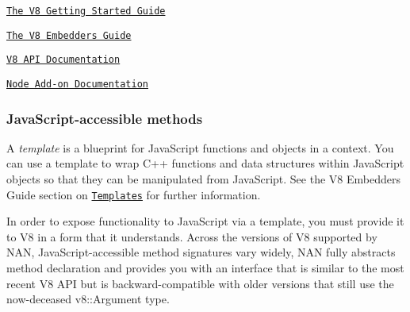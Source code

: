 \begin{DoxyItemize}
\item \href{https://developers.google.com/v8/get_started}{\tt The V8 Getting Started Guide}
\item \href{https://developers.google.com/v8/embed}{\tt The V8 Embedders Guide}
\item \href{http://v8docs.nodesource.com/}{\tt V8 A\+PI Documentation}
\item \href{https://nodejs.org/api/addons.html}{\tt Node Add-\/on Documentation}
\end{DoxyItemize}

\subsubsection*{Java\+Script-\/accessible methods}

A {\itshape template} is a blueprint for Java\+Script functions and objects in a context. You can use a template to wrap C++ functions and data structures within Java\+Script objects so that they can be manipulated from Java\+Script. See the V8 Embedders Guide section on \href{https://developers.google.com/v8/embed#templates}{\tt Templates} for further information.

In order to expose functionality to Java\+Script via a template, you must provide it to V8 in a form that it understands. Across the versions of V8 supported by N\+AN, Java\+Script-\/accessible method signatures vary widely, N\+AN fully abstracts method declaration and provides you with an interface that is similar to the most recent V8 A\+PI but is backward-\/compatible with older versions that still use the now-\/deceased {\ttfamily v8\+::\+Argument} type.


